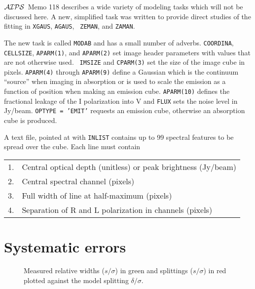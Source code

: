 \documentclass[twoside]{article}
\newcommand{\AIPS}{{$\cal AIPS\/$}}
\newcommand{\putfig}[1]{\texttt{[image: \#1.eps]}}
\begin{document}
\AIPS\ Memo 118 describes a wide variety of modeling tasks which will
not be discussed here.  A new, simplified task was written to provide
direct studies of the fitting in {\tt XGAUS}, {\tt AGAUS}, {\tt
  ZEMAN}, and {\tt ZAMAN}\@.

The new task is called {\tt MODAB} and has a small number of adverbs.
{\tt COORDINA}, {\tt CELLSIZE}, {\tt APARM(1)}, and {\tt APARM(2)} set
image header parameters with values that are not otherwise used.  {\tt
  IMSIZE} and {\tt CPARM(3)} set the size of the image cube in
pixels.  {\tt APARM(4)} through {\tt APARM(9)} define a Gaussian which
is the continuum ``source'' when imaging in absorption or is used to
scale the emission as a function of position when making an emission
cube.  {\tt APARM(10)} defines the fractional leakage of the I
polarization into V and {\tt FLUX} sets the noise level in Jy/beam.
{\tt OPTYPE = 'EMIT'} requests an emission cube, otherwise an
absorption cube is produced.

A text file, pointed at with {\tt INLIST} contains up to 99 spectral
features to be spread over the cube.  Each line must contain
\begin{center}
\begin{tabular}{|r|l|}\hline
 1. & Central optical depth (unitless) or peak brightness (Jy/beam)\\
 2. & Central spectral channel (pixels)\\
 3. & Full width of line at half-maximum (pixels)\\
 4. & Separation of R and L polarization in channels (pixels)\\\hline
\end{tabular}
\end{center}

\section{Systematic errors}

\begin{figure}
\begin{center}
\resizebox{6.0in}{!}{\putfig{PLOTR.model10}}
\caption{Measured relative widths ($s/\sigma$) in green and splittings
  ($s/\sigma$) in red plotted against the model splitting
  $\delta/\sigma$.}
\label{fig:PLOTR.model}
\end{center}
\end{figure}
\end{document}
